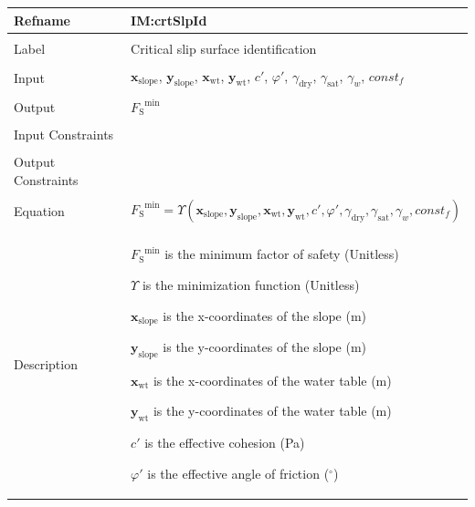 \documentclass[12pt]{article}
\begin{document}
\noindent \begin{minipage}{\textwidth}
\begin{tabular}{>{\raggedright}p{}>{\raggedright\arraybackslash}p{}}
\toprule \textbf{Refname} & \textbf{IM:crtSlpId}
\label{IM:crtSlpId}
\\ \midrule \\
Label & Critical slip surface identification
\\ \midrule \\
Input & ${\mathbf{x}_{\text{slope}}}$, ${\mathbf{y}_{\text{slope}}}$, ${\mathbf{x}_{\text{wt}}}$, ${\mathbf{y}_{\text{wt}}}$, $c'$, $φ'$, ${γ_{\text{dry}}}$, ${γ_{\text{sat}}}$, ${γ_{w}}$, $const_f$
\\ \midrule \\
Output & ${{F_{\text{S}}}^{\text{min}}}$
\\ \midrule \\
Input Constraints & 
\\ \midrule \\
Output Constraints & 
\\ \midrule \\
Equation & \begin{displaymath}
           {{F_{\text{S}}}^{\text{min}}}=Υ\left({\mathbf{x}_{\text{slope}}},{\mathbf{y}_{\text{slope}}},{\mathbf{x}_{\text{wt}}},{\mathbf{y}_{\text{wt}}},c',φ',{γ_{\text{dry}}},{γ_{\text{sat}}},{γ_{w}},const_f\right)
           \end{displaymath}
\\ \midrule \\
Description & \begin{symbDescription}
              \item{${{F_{\text{S}}}^{\text{min}}}$ is the minimum factor of safety (Unitless)}
              \item{$Υ$ is the minimization function (Unitless)}
              \item{${\mathbf{x}_{\text{slope}}}$ is the x-coordinates of the slope (m)}
              \item{${\mathbf{y}_{\text{slope}}}$ is the y-coordinates of the slope (m)}
              \item{${\mathbf{x}_{\text{wt}}}$ is the x-coordinates of the water table (m)}
              \item{${\mathbf{y}_{\text{wt}}}$ is the y-coordinates of the water table (m)}
              \item{$c'$ is the effective cohesion (Pa)}
              \item{$φ'$ is the effective angle of friction (${}^{\circ}$)}

\end{symbDescription}
\end{tabular}
\end{minipage}
\end{document}
